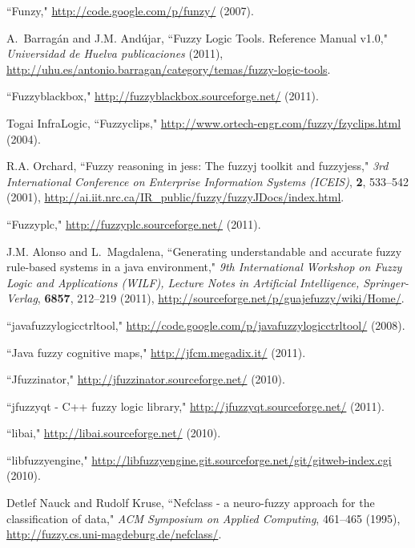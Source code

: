 \documentclass[11pt,twoside]{article}
\begin{document}
\begin{multicols}{2}
\begin{thebibliography}{10}
``Funzy," \url{http://code.google.com/p/funzy/} (2007).

A.~Barrag\'an and J.M. And\'ujar,
\newblock ``Fuzzy Logic Tools. Reference Manual v1.0," {\it Universidad de Huelva publicaciones} (2011), \url{http://uhu.es/antonio.barragan/category/temas/fuzzy-logic-tools}.

``Fuzzyblackbox," \url{http://fuzzyblackbox.sourceforge.net/} (2011).

Togai InfraLogic,
\newblock ``Fuzzyclips," \url{http://www.ortech-engr.com/fuzzy/fzyclips.html} (2004).

R.A. Orchard,
\newblock ``Fuzzy reasoning in jess: The fuzzyj toolkit and fuzzyjess," {\it 3rd International Conference on Enterprise Information Systems (ICEIS)}, {\bf 2}, 533--542 (2001), \url{http://ai.iit.nrc.ca/IR_public/fuzzy/fuzzyJDocs/index.html}.

``Fuzzyplc," \url{http://fuzzyplc.sourceforge.net/} (2011).

J.M. Alonso and L.~Magdalena,
\newblock ``Generating understandable and accurate fuzzy rule-based systems in a
  java environment," {\it 9th International Workshop on Fuzzy Logic and Applications
  (WILF), Lecture Notes in Artificial Intelligence, Springer-Verlag}, {\bf 6857}, 212--219 (2011),  \url{http://sourceforge.net/p/guajefuzzy/wiki/Home/}.

``javafuzzylogicctrltool," \url{http://code.google.com/p/javafuzzylogicctrltool/} (2008).

``Java fuzzy cognitive maps," \url{http://jfcm.megadix.it/} (2011).

``Jfuzzinator," \url{http://jfuzzinator.sourceforge.net/} (2010).

``jfuzzyqt - C++ fuzzy logic library," \url{http://jfuzzyqt.sourceforge.net/} (2011).

``libai," \url{http://libai.sourceforge.net/} (2010).

``libfuzzyengine," \url{http://libfuzzyengine.git.sourceforge.net/git/gitweb-index.cgi} (2010).

Detlef Nauck and Rudolf Kruse,
\newblock ``Nefclass - a neuro-fuzzy approach for the classification of data," {\it ACM Symposium on Applied Computing}, 461--465 (1995), \url{http://fuzzy.cs.uni-magdeburg.de/nefclass/}.


\end{thebibliography}
\end{multicols}
\end{document}
